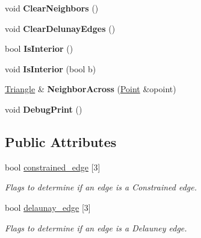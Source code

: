 \begin{DoxyCompactItemize}
\item 
\hypertarget{classp2t_1_1_triangle_a6073d6c3a3246e741954fdaa6ec1a938}{void {\bfseries Clear\+Neighbors} ()}\label{classp2t_1_1_triangle_a6073d6c3a3246e741954fdaa6ec1a938}

\item 
\hypertarget{classp2t_1_1_triangle_a4048dd780e71556f06c58e2184afd488}{void {\bfseries Clear\+Delunay\+Edges} ()}\label{classp2t_1_1_triangle_a4048dd780e71556f06c58e2184afd488}

\item 
\hypertarget{classp2t_1_1_triangle_aa3ec752fef9d4abe86b67eb4ef62fa6f}{bool {\bfseries Is\+Interior} ()}\label{classp2t_1_1_triangle_aa3ec752fef9d4abe86b67eb4ef62fa6f}

\item 
\hypertarget{classp2t_1_1_triangle_ae376125beedf79277b644beae1a3147a}{void {\bfseries Is\+Interior} (bool b)}\label{classp2t_1_1_triangle_ae376125beedf79277b644beae1a3147a}

\item 
\hypertarget{classp2t_1_1_triangle_a7c487e67ee4a64235b58207416a9ee84}{\hyperlink{classp2t_1_1_triangle}{Triangle} \& {\bfseries Neighbor\+Across} (\hyperlink{structp2t_1_1_point}{Point} \&opoint)}\label{classp2t_1_1_triangle_a7c487e67ee4a64235b58207416a9ee84}

\item 
\hypertarget{classp2t_1_1_triangle_a10ecbfda6b0126b5c7b3b803992d4160}{void {\bfseries Debug\+Print} ()}\label{classp2t_1_1_triangle_a10ecbfda6b0126b5c7b3b803992d4160}

\end{DoxyCompactItemize}
\subsection*{Public Attributes}
\begin{DoxyCompactItemize}
\item 
\hypertarget{classp2t_1_1_triangle_a66aea3f70ccfd359372cb747581f1653}{bool \hyperlink{classp2t_1_1_triangle_a66aea3f70ccfd359372cb747581f1653}{constrained\+\_\+edge} \mbox{[}3\mbox{]}}\label{classp2t_1_1_triangle_a66aea3f70ccfd359372cb747581f1653}

\begin{DoxyCompactList}\small\item\em Flags to determine if an edge is a Constrained edge. \end{DoxyCompactList}\item 
\hypertarget{classp2t_1_1_triangle_acbfdd0dba623a7b5d1dc8b81059c48b5}{bool \hyperlink{classp2t_1_1_triangle_acbfdd0dba623a7b5d1dc8b81059c48b5}{delaunay\+\_\+edge} \mbox{[}3\mbox{]}}\label{classp2t_1_1_triangle_acbfdd0dba623a7b5d1dc8b81059c48b5}

\begin{DoxyCompactList}\small\item\em Flags to determine if an edge is a Delauney edge. \end{DoxyCompactList}\end{DoxyCompactItemize}


